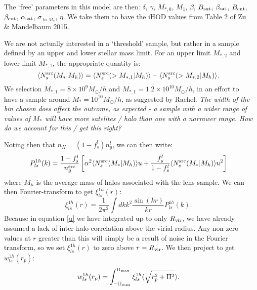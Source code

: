 \documentclass[onecolumn,amsmath,aps,fleqn, superscriptaddress]{revtex4}
\begin{document}
The `free' parameters in this model are then: $\delta$, $\gamma$, $M_{*,0}$, $M_1$, $\beta$, $B_{\rm sat}$, $\beta_{\rm sat}$, $B_{\rm cut}$, $\beta_{\rm cut}$, $\alpha_{\rm sat}$, $\sigma_{\ln M_*}$, $\eta$. We take them to have the iHOD values from Table 2 of Zu \& Mandelbaum 2015. 


We are not actually interested in a `threshold' sample, but rather in a sample defined by an upper and lower stellar mass limit. For an upper limit $M_{*,2}$ and lower limit $M_{*,1}$, the appropriate quantity is:
\begin{equation}
\langle  N_s^{\rm src} (M_{*} | M_h) \rangle = \langle  N_s^{\rm src} (>M_{*,1} | M_h) \rangle - \langle  N_s^{\rm src} (>M_{*,2} | M_h) \rangle.
\label{Nsmean_sources_binned}
\end{equation}
We selection $M_{*,1} = 8\times10^{9} M_\odot / h$ and $M_{*,1} = 1.2\times10^{10} M_\odot / h$, in an effort to have a sample around $M_* = 10^{10} M_\odot / h$, as suggested by Rachel. {\it The width of the bin chosen does affect the outcome, as expected - a sample with a wider range of values of $M_*$ will have more satelites / halo than one with a narrower range. How do we account for this / get this right?}

Noting then that $n_H = (1-f_s^l) n_g^l$, we can then write:
\begin{equation}
P_{ls}^{1h}(k) = \frac{1-f_s^l}{n_g^{\rm src}}\left[\alpha^2  \langle  N_s^{\rm src} (M_* | M_h) \rangle u + \frac{f_s^l}{1-f_s^l} \langle  N_s^{\rm src} (M_* | M_h) \rangle u^2\right]
\label{1hpgg_fs}
\end{equation}
where $M_h$ is the average mass of halos associated with the lens sample.
We can then Fourier-transform to get $\xi^{1h}_{ls}(r)$:
\begin{equation}
\xi_{ls}^{1h}(r) = \frac{1}{2\pi^2} \int dk k^2 \frac{\sin(kr)}{kr} P_{ls}^{1h}(k).
\label{xils1h}
\end{equation}
Because in equation \ref{u} we have integrated up to only $R_{\rm vir}$, we have already assumed a lack of inter-halo correlation above the virial radius. Any non-zero values at $r$ greater than this will simply be a result of noise in the Fourier transform, so we set $\xi_{ls}^{1h}(r)$ to zero above $r= R_{\rm vir}$. We then project to get $w_{ls}^{1h}(r_p)$:
\begin{equation}
w_{ls}^{1h}(r_p) = \int_{-\Pi_{\rm max}}^{\Pi_{\rm max}} \xi_{ls}^{1h}(\sqrt{r_p^2 + \Pi^2}).
\label{wl1h}
\end{equation}
\end{document}
